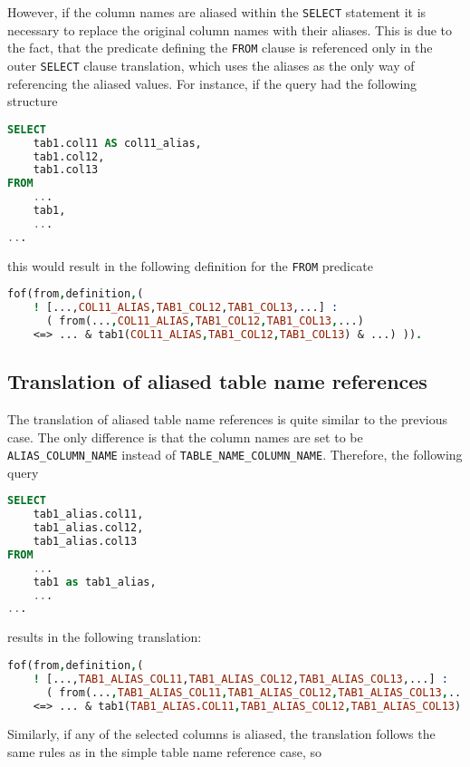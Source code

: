 \documentclass[magisterska,en]{pracamgr}
\newcommand{\code}[1]{\texttt{#1}}
\begin{document}
However, if the column names are aliased within the \code{SELECT} statement it is necessary to replace the original column names with their aliases. This is due to the fact, that the predicate defining the \code{FROM} clause is referenced only in the outer \code{SELECT} clause translation, which uses the aliases as the only way of referencing the aliased values. For instance, if the query had the following structure

\begin{lstlisting}[language=SQL]
SELECT
    tab1.col11 AS col11_alias,
    tab1.col12,
    tab1.col13
FROM
    ...
    tab1,
    ...
...
\end{lstlisting}

this would result in the following definition for the \code{FROM} predicate

\begin{lstlisting}[language=Prolog]
fof(from,definition,(
    ! [...,COL11_ALIAS,TAB1_COL12,TAB1_COL13,...] :
      ( from(...,COL11_ALIAS,TAB1_COL12,TAB1_COL13,...)
    <=> ... & tab1(COL11_ALIAS,TAB1_COL12,TAB1_COL13) & ...) )).
\end{lstlisting}



\subsection{Translation of aliased table name references}

The translation of aliased table name references is quite similar to the previous case. The only difference is that the column names are set to be \code{ALIAS_COLUMN_NAME} instead of \code{TABLE_NAME_COLUMN_NAME}. Therefore, the following query

\begin{lstlisting}[language=SQL]
SELECT
    tab1_alias.col11,
    tab1_alias.col12,
    tab1_alias.col13
FROM
    ...
    tab1 as tab1_alias,
    ...
...
\end{lstlisting}
results in the following translation:

\begin{lstlisting}[language=Prolog]
fof(from,definition,(
    ! [...,TAB1_ALIAS_COL11,TAB1_ALIAS_COL12,TAB1_ALIAS_COL13,...] :
      ( from(...,TAB1_ALIAS_COL11,TAB1_ALIAS_COL12,TAB1_ALIAS_COL13,...)
    <=> ... & tab1(TAB1_ALIAS.COL11,TAB1_ALIAS_COL12,TAB1_ALIAS_COL13) & ...) )).
\end{lstlisting}

Similarly, if any of the selected columns is aliased, the translation follows the same rules as in the simple table name reference case, so
\end{document}
